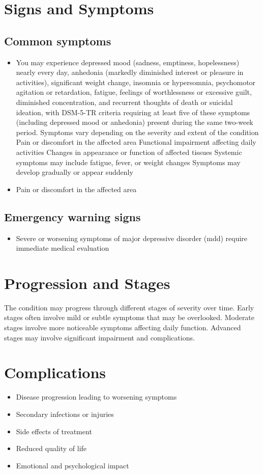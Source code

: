 \section{Signs and Symptoms}

\subsection{Common symptoms}
\begin{itemize}[noitemsep]
  \item You may experience depressed mood (sadness, emptiness, hopelessness) nearly every day, anhedonia (markedly diminished interest or pleasure in activities), significant weight change, insomnia or hypersomnia, psychomotor agitation or retardation, fatigue, feelings of worthlessness or excessive guilt, diminished concentration, and recurrent thoughts of death or suicidal ideation, with DSM-5-TR criteria requiring at least five of these symptoms (including depressed mood or anhedonia) present during the same two-week period. Symptoms vary depending on the severity and extent of the condition Pain or discomfort in the affected area Functional impairment affecting daily activities Changes in appearance or function of affected tissues Systemic symptoms may include fatigue, fever, or weight changes Symptoms may develop gradually or appear suddenly
  \item Pain or discomfort in the affected area
  \end{itemize}

\subsection{Emergency warning signs}
\begin{itemize}[noitemsep]
  \item Severe or worsening symptoms of major depressive disorder (mdd) require immediate medical evaluation
\end{itemize}
\section{Progression and Stages}
The condition may progress through different stages of severity over time. Early stages often involve mild or subtle symptoms that may be overlooked. Moderate stages involve more noticeable symptoms affecting daily function. Advanced stages may involve significant impairment and complications.
\section{Complications}
\begin{itemize}[noitemsep]
  \item Disease progression leading to worsening symptoms
  \item Secondary infections or injuries
  \item Side effects of treatment
  \item Reduced quality of life
  \item Emotional and psychological impact
\end{itemize}
